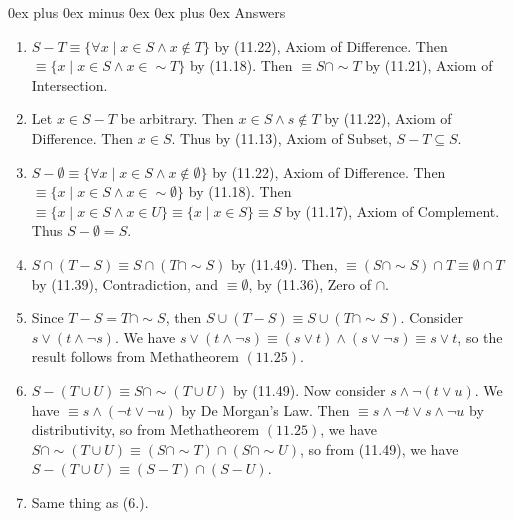 \documentclass[letterpaper, 8pt]{extarticle}
\makeatletter
\renewcommand{\subsubsection}{\@startsection{subsubsection}{3}{0mm}%
                                {0ex plus 0ex minus 0ex}%
                                {0ex plus 0ex}%
                                {\normalfont\tiny\bfseries}}
\makeatother
\begin{document}
\begin{multicols*}{3}
    \subsubsection{Answers }
    \begin{enumerate}
        \item
              $S - T \equiv \{\forall x \mid x \in S \land x \notin T\}$ by (11.22), Axiom of
              Difference. Then $\equiv \{x \mid x \in S \land x \in \sim T \}$ by (11.18). Then
              $\equiv S \cap \sim T$ by (11.21), Axiom of Intersection.
        \item
              Let $x \in S - T$ be arbitrary. Then $x \in S \land s \notin T$ by (11.22), Axiom
              of Difference. Then $x \in S$. Thus by (11.13), Axiom of Subset, $S - T \subseteq S$.
        \item
              $S - \emptyset \equiv \{\forall x \mid x \in S \land x \notin \emptyset\}$ by (11.22),
              Axiom of Difference. Then $\equiv \{x \mid x \in S \land x \in \sim \emptyset \}$ by
              (11.18). Then $\equiv \{x \mid x \in S \land x \in U \} \equiv \{x \mid x \in S \}
                  \equiv S$ by (11.17), Axiom of Complement. Thus $S - \emptyset = S$.
        \item
              $S \cap (T - S) \equiv S \cap (T \cap \sim S)$ by (11.49). Then, $\equiv (S \cap \sim
                  S) \cap T \equiv \emptyset \cap T$ by (11.39), Contradiction, and $\equiv \emptyset$,
              by (11.36), Zero of $\cap$.
        \item
              Since $T - S = T \cap \sim S$, then $S \cup (T - S) \equiv S \cup (T \cap \sim S)$.
              Consider $s \lor (t \land \lnot s)$. We have $s \lor (t \land \lnot s) \equiv (s \lor t)
                  \land (s \lor \lnot s) \equiv s \lor t$, so the result follows from Methatheorem $(11.25)$.
        \item
              $S - (T \cup U) \equiv S \cap \sim(T \cup U)$ by (11.49). Now consider
              $s \land \lnot (t \lor u)$. We have $\equiv s \land (\lnot t \lor \lnot u)$ by De Morgan's
              Law. Then $\equiv s \land \lnot t \lor s \land \lnot u$ by distributivity, so from
              Methatheorem $(11.25)$, we have $S \cap \sim (T \cup U) \equiv (S \cap \sim T) \cap
                  (S \cap \sim U)$, so from (11.49), we have $S - (T \cup U) \equiv (S - T) \cap (S - U)$.
        \item
              Same thing as (6.).
    \end{enumerate}


\end{multicols*}
\end{document}
